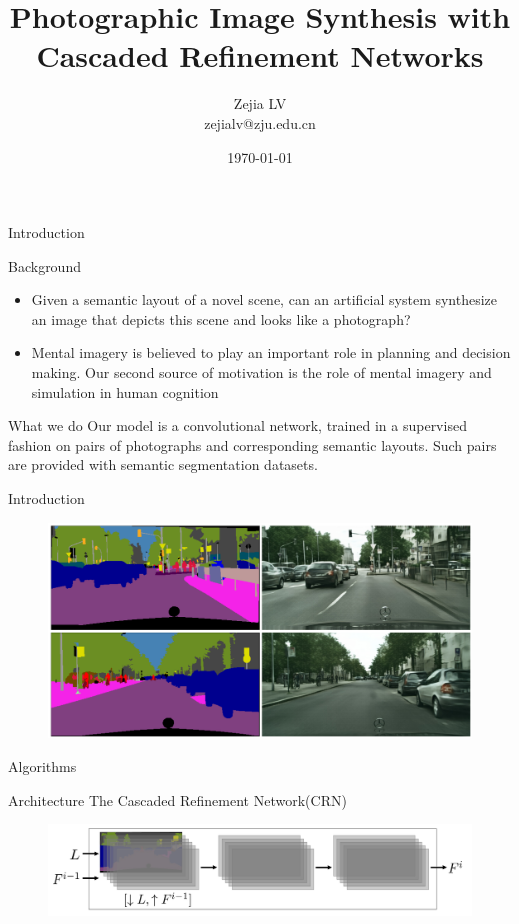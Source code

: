 \documentclass[notes]{beamer}
\title[]{Photographic Image Synthesis with Cascaded Refinement Networks}
\author[Zejia LV]{Zejia LV \\ zejialv@zju.edu.cn}
\date[\today]{\today}
\begin{document}
\begin{frame}
	\titlepage
\end{frame}


\begin{frame}{Introduction}
	\begin{block}{Background}
	\begin{itemize}
		\item Given a semantic layout of a novel scene, can an artificial system synthesize an image that depicts this scene and looks like a photograph?
		\item Mental imagery is believed to play an important role in planning and decision making. Our second source of motivation is the role of mental
imagery and simulation in human cognition
	\end{itemize}
		
	\end{block}	
	\begin{block}{What we do}
		 Our model is a convolutional network, trained in a supervised fashion on pairs of photographs and corresponding semantic layouts. Such pairs are provided with semantic segmentation datasets.
	\end{block}
\end{frame}

\begin{frame}{Introduction}
	\begin{figure}
			\includegraphics[width=1.0\textwidth]{1.png}
	\end{figure}	
\end{frame}




\begin{frame}{Algorithms}
	\begin{block}{ Architecture}
	 The Cascaded Refinement Network(CRN)
		\begin{figure}
			\includegraphics[width=1.0\textwidth]{2.png}
		\end{figure}
	\end{block}
\end{frame}
\end{document}
